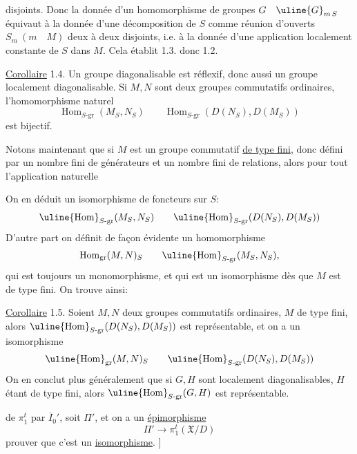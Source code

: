 disjoints. Donc la donnée d'un homomorphisme de groupes
$G\quad\uline{G}_{m\,S}$
équivaut à la donnée d'une décomposition de $S$ comme réunion d'ouverts
$S_m\ (m\quad M)$ deux à deux disjoints, i.e. à la donnée d'une application
localement constante de $S$ dans $M$. Cela établit 1.3. donc 1.2.

\uline{Corollaire} 1.4. Un groupe diagonalisable est réflexif, donc aussi un
groupe localement diagonalisable. Si $M,N$ sont deux groupes commutatifs
ordinaires,  l'homomorphisme naturel
\[
\operatorname{Hom}_{S\text{-gr}}(M_S,N_S)
\qquad
\operatorname{Hom}_{S\text{-gr}}(D(N_S),D(M_S))
\]
est bijectif.

Notons maintenant que si $M$ est un groupe commutatif \uline{de type fini},
 donc défini par un nombre fini de générateurs et un nombre fini de
relations, alors pour tout
l'application naturelle

On en déduit un isomorphisme de foncteurs sur $S$:
\[
\uline{\operatorname{Hom}}_{S\text{-gr}}(M_S,N_S)
\qquad
\uline{\operatorname{Hom}}_{S\text{-gr}}(D(N_S),D(M_S))
\]
D'autre part on définit de façon évidente un homomorphisme
\[
\operatorname{Hom}_{\mathrm{gr}}(M,N)_S
\qquad
\uline{\operatorname{Hom}}_{S\text{-gr}}(M_S,N_S),
\]
qui est toujours  un monomorphisme, et qui est un isomorphisme dès
que $M$ est de type fini. On trouve ainsi:

\uline{Corollaire} 1.5. 
Soient $M,N$ deux groupes commutatifs
ordinaires, $M$ de type fini, alors 
$\uline{\operatorname{Hom}}_{S\text{-gr}}(D(N_S),D(M_S))$ est
représentable, et on a un isomorphisme
\[
\uline{\operatorname{Hom}}_{\mathrm{gr}}(M,N)_S
\qquad
\uline{\operatorname{Hom}}_{S\text{-gr}}(D(N_S),D(M_S))
\]
On en conclut plus généralement que si $G,H$ sont localement diagonalisables,
$H$ étant de type fini, alors
$\uline{\operatorname{Hom}}_{S\text{-gr}}(G,H)$ est représentable.

de $\pi_1^t$ par $\overline I_0'$, soit
 $\Pi'$, et on a
  un \uline{épimorphisme}
\[
 \Pi'\longrightarrow\pi_1^t(\mathfrak X/D)
\]
prouver que c'est un \uline{isomorphisme}. ]

